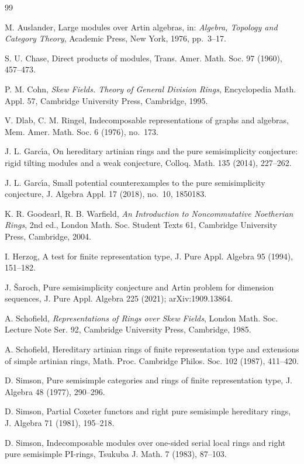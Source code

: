 \documentclass[11pt,a4paper]{amsart}
\numberwithin{equation}{section}
\begin{document}
\begin{thebibliography}{99}

 M. Auslander, Large modules over Artin algebras, in: \emph{Algebra, Topology and Category Theory}, Academic Press, New York, 1976, pp.~3--17.

 S. U. Chase, Direct products of modules, Trans. Amer. Math. Soc. 97 (1960), 457--473.

 P. M. Cohn, \emph{Skew Fields. Theory of General Division Rings}, Encyclopedia Math. Appl. 57, Cambridge University Press, Cambridge, 1995.

 V. Dlab, C. M. Ringel, Indecomposable representations of graphs and algebras, Mem. Amer. Math. Soc. 6 (1976), no.~173.

 J. L. Garc\'{\i}a, On hereditary artinian rings and the pure semisimplicity conjecture: rigid tilting modules and a weak conjecture, Colloq. Math. 135 (2014), 227--262.

 J. L. Garc\'{\i}a, Small potential counterexamples to the pure semisimplicity conjecture, J. Algebra Appl. 17 (2018), no.~10, 1850183.

 K. R. Goodearl, R. B. Warfield, \emph{An Introduction to Noncommutative Noetherian Rings}, 2nd ed., London Math. Soc. Student Texts 61, Cambridge University Press, Cambridge, 2004.

 I. Herzog, A test for finite representation type, J. Pure Appl. Algebra 95 (1994), 151--182.

 J. \v{S}aroch, Pure semisimplicity conjecture and Artin problem for dimension sequences, J. Pure Appl. Algebra 225 (2021); arXiv:1909.13864.

 A. Schofield, \emph{Representations of Rings over Skew Fields}, London Math. Soc. Lecture Note Ser. 92, Cambridge University Press, Cambridge, 1985.

 A. Schofield, Hereditary artinian rings of finite representation type and extensions of simple artinian rings, Math. Proc. Cambridge Philos. Soc. 102 (1987), 411--420.

 D. Simson, Pure semisimple categories and rings of finite representation type, J. Algebra 48 (1977), 290--296.

 D. Simson, Partial Coxeter functors and right pure semisimple hereditary rings, J. Algebra 71 (1981), 195--218.

 D. Simson, Indecomposable modules over one-sided serial local rings and right pure semisimple PI-rings, Tsukuba J. Math. 7 (1983), 87--103.


\end{thebibliography}
\end{document}
